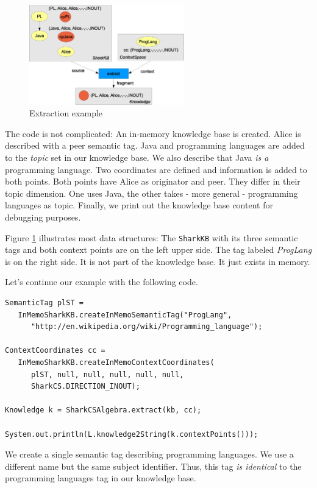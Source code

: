 \begin{figure}[t]
\centering
\includegraphics[width=0.60\textwidth]{extraction.eps}
\caption{Extraction example}
\label{fig:extraction}
\end{figure}

The code is not complicated:
An in-memory knowledge base is created. Alice is described with a peer semantic tag. Java and programming languages are added to the {\it topic} set in our knowledge base. We also describe that Java {\it is a} programming language. Two coordinates are defined and information is added to both points. Both points have Alice as originator and peer. They differ in their topic dimension. One uses Java, the other takes - more general - programming languages as topic. Finally, we print out the knowledge base content for debugging purposes. 

Figure \ref{fig:extraction} illustrates most data structures: The {\tt SharkKB} with its three semantic tags and both context points are on the left upper side. 
The tag labeled {\it ProgLang} is on the right side. It is not part of the knowledge base. It just exists in memory.

Let's continue our example with the following code.

\begin{verbatim}
SemanticTag plST = 
   InMemoSharkKB.createInMemoSemanticTag("ProgLang", 
      "http://en.wikipedia.org/wiki/Programming_language");

ContextCoordinates cc = 
   InMemoSharkKB.createInMemoContextCoordinates(
      plST, null, null, null, null, null, 
      SharkCS.DIRECTION_INOUT);

Knowledge k = SharkCSAlgebra.extract(kb, cc);

System.out.println(L.knowledge2String(k.contextPoints()));
\end{verbatim}

We create a single semantic tag describing programming languages. 
We use a different name but the same subject identifier. Thus, this 
tag {\it is identical} to the programming languages tag in our knowledge base.

